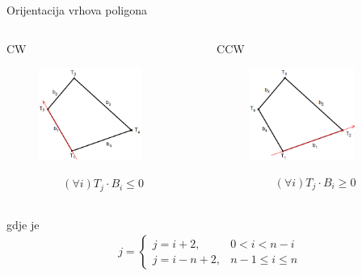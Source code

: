 \documentclass[9pt]{beamer}
\begin{document}
\begin{frame}{Orijentacija vrhova poligona}
	\begin{columns}
		\begin{column}[t]{0.5\textwidth}
			CW
			\begin{figure}
				\centering
				\includegraphics[width=0.8\textwidth]{slike/poligon_cw.png}
			\end{figure}
			\begin{align*}
			(\forall i) T_j \cdot B_i \leq 0 
			\end{align*}
		\end{column}
		\begin{column}[t]{0.5\textwidth}
			CCW
			\begin{figure}
				\centering		
				\includegraphics[width=0.8\textwidth]{slike/poligon_ccw.png}
			\end{figure}
			\begin{align*}
			(\forall i) T_j \cdot B_i \geq 0 
			\end{align*}
		\end{column}
	\end{columns}
	gdje je 
	\begin{align*}
	j = \left\{ \begin{array}{cc}
	j = i+2, & 0 < i < n-i \\
	j = i-n +2, & n-1 \leq i \leq n 
	\end{array}
	\right.
	\end{align*}
\end{frame}
\end{document}

